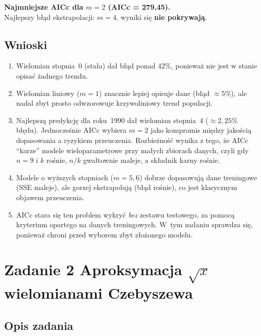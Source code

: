 \documentclass[12pt, a4paper]{article}
\begin{document}
\noindent
\textbf{Najmniejsze AICc dla $m = 2$ (AICc = 279{,}45).}\\
Najlepszy błąd ekstrapolacji: $m = 4$, wyniki się \textbf{nie pokrywają}.

\subsection{Wnioski}

\begin{enumerate}
  \item Wielomian stopnia~0 (stała) dał błąd ponad $42\%$, ponieważ
        nie jest w stanie opisać żadnego trendu.

  \item Wielomian liniowy ($m = 1$) znacznie lepiej opisuje dane
        (błąd $\approx 5\%$), ale nadal zbyt prosto odwzorowuje
        krzywoliniowy trend populacji.

  \item Najlepszą predykcję dla roku~1990 dał wielomian stopnia~4
        ($\approx 2{,}25\%$ błędu). Jednocześnie AICc wybiera $m = 2$
        jako kompromis między jakością dopasowania a ryzykiem
        przeuczenia. Rozbieżność wynika z tego, że AICc ``karze''
        modele wieloparametrowe przy małych zbiorach danych, czyli gdy
        $n = 9$ i $k$ rośnie, $n/k$ gwałtownie maleje, a składnik
        karny rośnie.

  \item Modele o wyższych stopniach ($m = 5, 6$) dobrze dopasowują
        dane treningowe (SSE maleje), ale gorzej ekstrapolują (błąd
        rośnie), co jest klasycznym objawem przeuczenia.

  \item AICc stara się ten problem wykryć \emph{bez} zestawu
        testowego, za pomocą kryterium opartego na danych
        treningowych. W~tym zadaniu sprawdza się, ponieważ chroni
        przed wyborem zbyt złożonego modelu.
\end{enumerate}

\section{Zadanie 2 \textemdash{} Aproksymacja $\sqrt{x}$ wielomianami Czebyszewa}

\subsection{Opis zadania}
\end{document}
